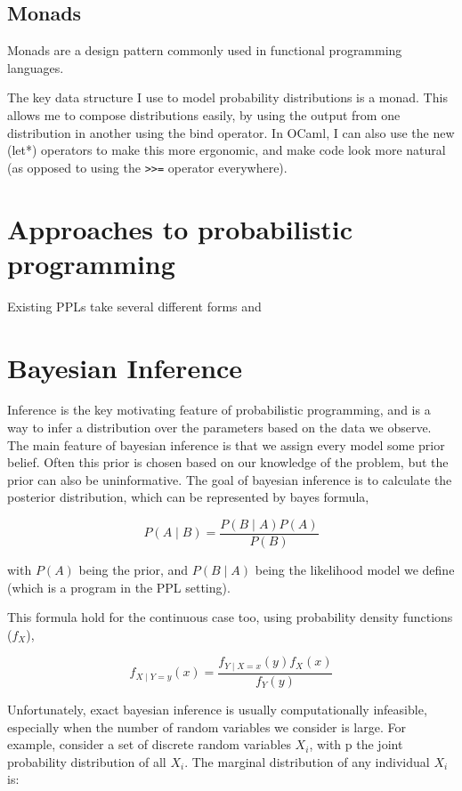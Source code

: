 \subsection{Monads}

Monads are a design pattern commonly used in functional programming languages.

The key data structure I use to model probability distributions is a monad. This allows me to compose distributions easily, by using the output from one distribution in another using the bind operator. In OCaml, I can also use the new (let*) operators to make this more ergonomic, and make code look more natural (as opposed to using the \texttt{>>=} operator everywhere).

\section{Approaches to probabilistic programming}
Existing PPLs take several different forms and 


\section{Bayesian Inference}
Inference is the key motivating feature of probabilistic programming, and is a way to infer a distribution over the parameters based on the data we observe. The main feature of bayesian inference is that we assign every model some prior belief. Often this prior is chosen based on our knowledge of the problem, but the prior can also be uninformative. The goal of bayesian inference is to calculate the posterior distribution, which can be represented by bayes formula,

$$P(A\mid B)={\frac {P(B\mid A)P(A)}{P(B)}}$$

with $P(A)$ being the prior, and $P(B\mid A)$ being the likelihood model we define (which is a program in the PPL setting).

This formula hold for the continuous case too, using probability density functions ($f_X$),

$$ f_{X\mid Y=y}(x)={\frac {f_{Y\mid X=x}(y)f_{X}(x)}{f_{Y}(y)}} $$

Unfortunately, exact bayesian inference is usually computationally infeasible, especially when the number of random variables we consider is large. For example, consider a set of discrete random variables ${X_i}$, with p the joint probability distribution of all $X_i$. The marginal distribution of any individual $X_i$ is:

